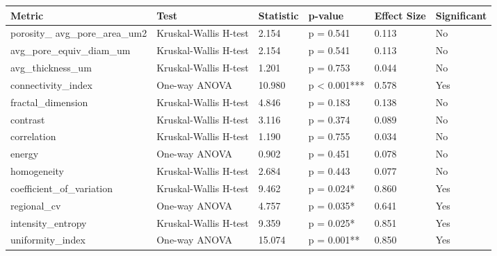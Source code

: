 \begin{tabular}{llllll}
\toprule
Metric & Test & Statistic & p-value & Effect Size & Significant \\
\midrule
porosity_%
avg_pore_area_um2 & Kruskal-Wallis H-test & 2.154 & p = 0.541 & 0.113 & No \\
avg_pore_equiv_diam_um & Kruskal-Wallis H-test & 2.154 & p = 0.541 & 0.113 & No \\
avg_thickness_um & Kruskal-Wallis H-test & 1.201 & p = 0.753 & 0.044 & No \\
connectivity_index & One-way ANOVA & 10.980 & p < 0.001*** & 0.578 & Yes \\
fractal_dimension & Kruskal-Wallis H-test & 4.846 & p = 0.183 & 0.138 & No \\
contrast & Kruskal-Wallis H-test & 3.116 & p = 0.374 & 0.089 & No \\
correlation & Kruskal-Wallis H-test & 1.190 & p = 0.755 & 0.034 & No \\
energy & One-way ANOVA & 0.902 & p = 0.451 & 0.078 & No \\
homogeneity & Kruskal-Wallis H-test & 2.684 & p = 0.443 & 0.077 & No \\
coefficient_of_variation & Kruskal-Wallis H-test & 9.462 & p = 0.024* & 0.860 & Yes \\
regional_cv & One-way ANOVA & 4.757 & p = 0.035* & 0.641 & Yes \\
intensity_entropy & Kruskal-Wallis H-test & 9.359 & p = 0.025* & 0.851 & Yes \\
uniformity_index & One-way ANOVA & 15.074 & p = 0.001** & 0.850 & Yes \\
\bottomrule
\end{tabular}
